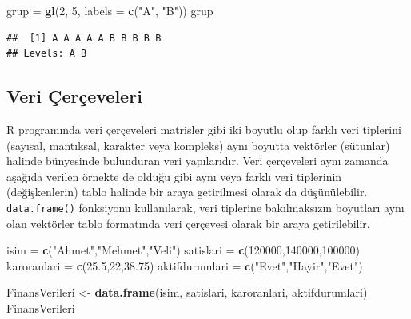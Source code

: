 \documentclass[
]{book}
\newenvironment{Shaded}{\begin{snugshade}}{\end{snugshade}}
\newcommand{\AttributeTok}[1]{\textcolor[rgb]{0.13,0.29,0.53}{#1}}
\newcommand{\DecValTok}[1]{\textcolor[rgb]{0.00,0.00,0.81}{#1}}
\newcommand{\FloatTok}[1]{\textcolor[rgb]{0.00,0.00,0.81}{#1}}
\newcommand{\FunctionTok}[1]{\textcolor[rgb]{0.13,0.29,0.53}{\textbf{#1}}}
\newcommand{\NormalTok}[1]{#1}
\newcommand{\OtherTok}[1]{\textcolor[rgb]{0.56,0.35,0.01}{#1}}
\newcommand{\StringTok}[1]{\textcolor[rgb]{0.31,0.60,0.02}{#1}}
\begin{document}
\begin{Shaded}
\begin{Highlighting}[]
\NormalTok{grup }\OtherTok{=} \FunctionTok{gl}\NormalTok{(}\DecValTok{2}\NormalTok{, }\DecValTok{5}\NormalTok{, }\AttributeTok{labels =} \FunctionTok{c}\NormalTok{(}\StringTok{"A"}\NormalTok{, }\StringTok{"B"}\NormalTok{))}
\NormalTok{grup}
\end{Highlighting}
\end{Shaded}

\begin{verbatim}
##  [1] A A A A A B B B B B
## Levels: A B
\end{verbatim}

\subsection{Veri Çerçeveleri}\label{veri-uxe7eruxe7eveleri}

R programında veri çerçeveleri matrisler gibi iki boyutlu olup farklı veri tiplerini (sayısal, mantıksal, karakter veya kompleks) aynı boyutta vektörler (sütunlar) halinde bünyesinde bulunduran veri yapılarıdır. Veri çerçeveleri aynı zamanda aşağıda verilen örnekte de olduğu gibi aynı veya farklı veri tiplerinin (değişkenlerin) tablo halinde bir araya getirilmesi olarak da düşünülebilir. \texttt{data.frame()} fonksiyonu kullanılarak, veri tiplerine bakılmaksızın boyutları aynı olan vektörler tablo formatında veri çerçevesi olarak bir araya getirilebilir.

\begin{Shaded}
\begin{Highlighting}[]
\NormalTok{isim }\OtherTok{=} \FunctionTok{c}\NormalTok{(}\StringTok{"Ahmet"}\NormalTok{,}\StringTok{"Mehmet"}\NormalTok{,}\StringTok{"Veli"}\NormalTok{)}
\NormalTok{satislari }\OtherTok{=} \FunctionTok{c}\NormalTok{(}\DecValTok{120000}\NormalTok{,}\DecValTok{140000}\NormalTok{,}\DecValTok{100000}\NormalTok{)}
\NormalTok{karoranlari }\OtherTok{=} \FunctionTok{c}\NormalTok{(}\FloatTok{25.5}\NormalTok{,}\DecValTok{22}\NormalTok{,}\FloatTok{38.75}\NormalTok{)}
\NormalTok{aktifdurumlari }\OtherTok{=} \FunctionTok{c}\NormalTok{(}\StringTok{"Evet"}\NormalTok{,}\StringTok{"Hayir"}\NormalTok{,}\StringTok{"Evet"}\NormalTok{)}

\NormalTok{FinansVerileri }\OtherTok{\textless{}{-}} \FunctionTok{data.frame}\NormalTok{(isim, satislari, karoranlari, aktifdurumlari)}
\NormalTok{FinansVerileri}
\end{Highlighting}
\end{Shaded}
\end{document}
